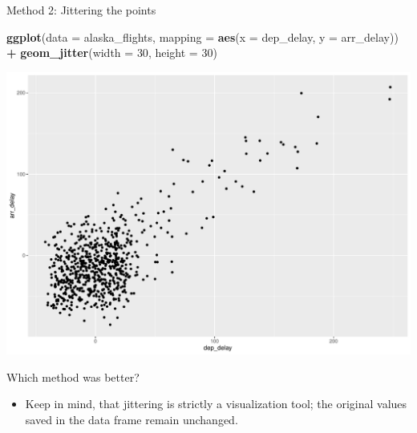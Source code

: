 \documentclass[
  ignorenonframetext,
]{beamer}
\newenvironment{Shaded}{\begin{snugshade}}{\end{snugshade}}
\newcommand{\AttributeTok}[1]{\textcolor[rgb]{0.13,0.29,0.53}{#1}}
\newcommand{\DecValTok}[1]{\textcolor[rgb]{0.00,0.00,0.81}{#1}}
\newcommand{\FunctionTok}[1]{\textcolor[rgb]{0.13,0.29,0.53}{\textbf{#1}}}
\newcommand{\NormalTok}[1]{#1}
\newcommand{\SpecialCharTok}[1]{\textcolor[rgb]{0.81,0.36,0.00}{\textbf{#1}}}
\providecommand{\tightlist}{%
  \setlength{\itemsep}{0pt}\setlength{\parskip}{0pt}}
\begin{document}
\begin{frame}[fragile]{Method 2: Jittering the points}
\protect\hypertarget{method-2-jittering-the-points-1}{}
\tiny

\begin{Shaded}
\begin{Highlighting}[]
\FunctionTok{ggplot}\NormalTok{(}\AttributeTok{data =}\NormalTok{ alaska\_flights, }\AttributeTok{mapping =} \FunctionTok{aes}\NormalTok{(}\AttributeTok{x =}\NormalTok{ dep\_delay, }\AttributeTok{y =}\NormalTok{ arr\_delay)) }\SpecialCharTok{+} 
  \FunctionTok{geom\_jitter}\NormalTok{(}\AttributeTok{width =} \DecValTok{30}\NormalTok{, }\AttributeTok{height =} \DecValTok{30}\NormalTok{)}
\end{Highlighting}
\end{Shaded}

\begin{center}\includegraphics[width=0.7\linewidth,height=0.5\textheight]{Week2_Lect_files/figure-beamer/unnamed-chunk-24-1} \end{center}
\normalsize

Which method was better?

\begin{itemize}
\tightlist
\item
  Keep in mind, that jittering is strictly a visualization tool; the
  original values saved in the data frame remain unchanged.
\end{itemize}
\end{frame}
\end{document}
